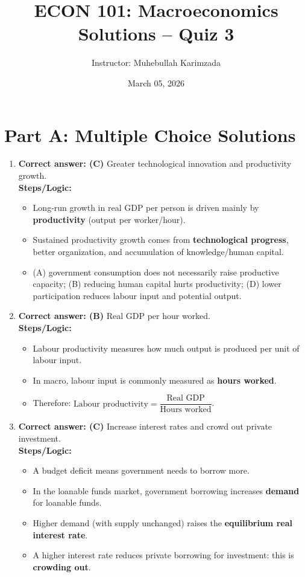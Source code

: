 \documentclass[12pt]{article}
\title{ECON 101: Macroeconomics \\ Solutions -- Quiz 3}
\author{Instructor: Muhebullah Karimzada}
\date{March 05,  2026}
\begin{document}
\maketitle

\section*{Part A: Multiple Choice Solutions}

\begin{enumerate}[label=\textbf{\arabic*.}]

\item \textbf{Correct answer: (C)} \; Greater technological innovation and productivity growth.\\
\textbf{Steps/Logic:}
\begin{itemize}
    \item Long-run growth in real GDP per person is driven mainly by \textbf{productivity} (output per worker/hour).
    \item Sustained productivity growth comes from \textbf{technological progress}, better organization, and accumulation of knowledge/human capital.
    \item (A) government consumption does not necessarily raise productive capacity; (B) reducing human capital hurts productivity; (D) lower participation reduces labour input and potential output.
\end{itemize}

\item \textbf{Correct answer: (B)} \; Real GDP per hour worked.\\
\textbf{Steps/Logic:}
\begin{itemize}
    \item Labour productivity measures how much output is produced per unit of labour input.
    \item In macro, labour input is commonly measured as \textbf{hours worked}.
    \item Therefore: \(\text{Labour productivity} = \dfrac{\text{Real GDP}}{\text{Hours worked}}\).
\end{itemize}

\item \textbf{Correct answer: (C)} \; Increase interest rates and crowd out private investment.\\
\textbf{Steps/Logic:}
\begin{itemize}
    \item A budget deficit means government needs to borrow more.
    \item In the loanable funds market, government borrowing increases \textbf{demand} for loanable funds.
    \item Higher demand (with supply unchanged) raises the \textbf{equilibrium real interest rate}.
    \item A higher interest rate reduces private borrowing for investment: this is \textbf{crowding out}.
\end{itemize}


\end{enumerate}
\end{document}
